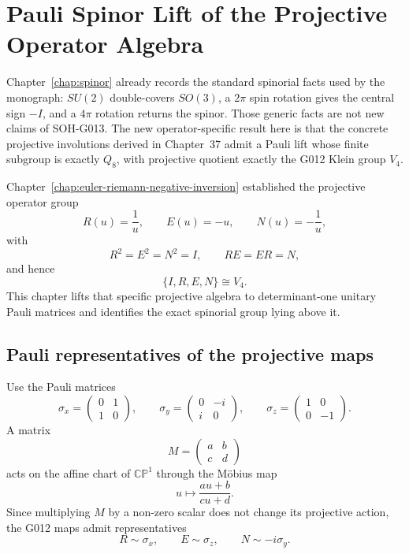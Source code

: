 \chapter{Pauli Spinor Lift of the Projective Operator Algebra}
\label{chap:pauli-spinor-lift}


Chapter~\ref{chap:spinor} already records the standard spinorial facts used by
the monograph: \(SU(2)\) double-covers \(SO(3)\), a \(2\pi\) spin rotation gives
the central sign \(-I\), and a \(4\pi\) rotation returns the spinor.  Those
generic facts are not new claims of SOH-G013.  The new operator-specific result
here is that the concrete projective involutions derived in Chapter~37 admit a
Pauli lift whose finite subgroup is exactly \(Q_8\), with projective quotient
exactly the G012 Klein group \(V_4\).

Chapter~\ref{chap:euler-riemann-negative-inversion} established the projective
operator group
\[
 R(u)=\frac1u,
 \qquad
 E(u)=-u,
 \qquad
 N(u)=-\frac1u,
\]
with
\[
 R^2=E^2=N^2=I,
 \qquad
 RE=ER=N,
\]
and hence
\[
 \{I,R,E,N\}\cong V_4.
\]
This chapter lifts that specific projective algebra to determinant-one unitary
Pauli matrices and identifies the exact spinorial group lying above it.

\section{Pauli representatives of the projective maps}

Use the Pauli matrices
\[
 \sigma_x=
 \begin{pmatrix}0&1\\1&0\end{pmatrix},
 \qquad
 \sigma_y=
 \begin{pmatrix}0&-i\\i&0\end{pmatrix},
 \qquad
 \sigma_z=
 \begin{pmatrix}1&0\\0&-1\end{pmatrix}.
\]
A matrix
\[
 M=\begin{pmatrix}a&b\\c&d\end{pmatrix}
\]
acts on the affine chart of \(\mathbb{CP}^1\) through the Möbius map
\[
 u\longmapsto\frac{au+b}{cu+d}.
\]
Since multiplying \(M\) by a non-zero scalar does not change its projective
action, the G012 maps admit representatives
\[
 R\sim\sigma_x,
 \qquad
 E\sim\sigma_z,
 \qquad
 N\sim-i\sigma_y.
\]


